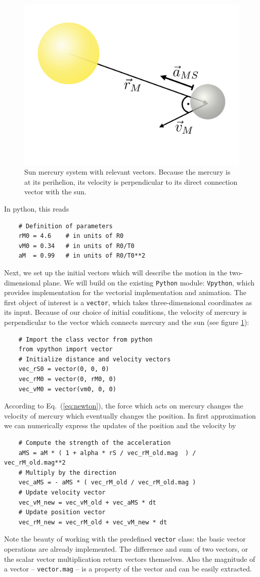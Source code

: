 \documentclass[12pt]{iopart}
\newcommand{\python}[0]{\texttt{Python} }
\begin{document}
\begin{figure}[htb]
	\centering
	\includegraphics[width=.4\textwidth]{figs/sun_merc.pdf}
	\caption{\label{fig:sun_merc}Sun mercury system with relevant vectors.  Because the mercury is at its perihelion, its velocity is perpendicular to its direct connection vector with the sun.}
\end{figure}


In python, this reads
\begin{lstlisting}
	# Definition of parameters
	rM0 = 4.6    # in units of R0
	vM0 = 0.34   # in units of R0/T0
	aM  = 0.99   # in units of R0/T0**2
\end{lstlisting}
Next, we set up the initial vectors which will describe the motion in the two-dimensional plane.  We will build on the existing \python module: \texttt{Vpython}, which provides implementation for the vectorial implementation and animation.  The first object of interest is a \texttt{vector}, which takes three-dimensional coordinates as its input.  Because of our choice of initial conditions, the velocity of mercury is perpendicular to the vector which connects mercury and the sun (see figure \ref{fig:sun_merc}):
\begin{lstlisting}
	# Import the class vector from python
	from vpython import vector
	# Initialize distance and velocity vectors
	vec_rS0 = vector(0, 0, 0)
	vec_rM0 = vector(0, rM0, 0)
	vec_vM0 = vector(vm0, 0, 0)
\end{lstlisting}
According to Eq.~(\ref{eq:newton}), the force which acts on mercury changes the velocity of mercury which eventually changes the position.  In first approximation we can numerically express the updates of the position and the velocity by
\begin{lstlisting}
	# Compute the strength of the acceleration
	aMS = aM * ( 1 + alpha * rS / vec_rM_old.mag  ) / vec_rM_old.mag**2
	# Multiply by the direction
	vec_aMS = - aMS * ( vec_rM_old / vec_rM_old.mag )
	# Update velocity vector
	vec_vM_new = vec_vM_old + vec_aMS * dt
	# Update position vector
	vec_rM_new = vec_rM_old + vec_vM_new * dt
\end{lstlisting}
Note the beauty of working with the predefined \texttt{vector} class: the basic vector operations are already implemented.  The difference and sum of two vectors, or the scalar vector multiplication return vectors themselves.  Also the magnitude of a vector -- \texttt{vector.mag} -- is a property of the vector and can be easily extracted.
\end{document}
